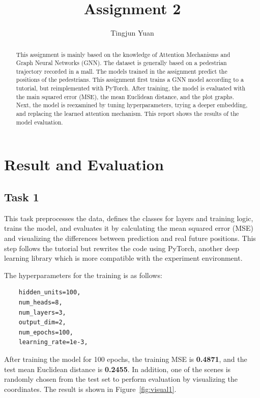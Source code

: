 \documentclass[conference]{IEEEtran}
\begin{document}
\title{Assignment 2}

\author{Tingjun Yuan}

\maketitle

\begin{abstract}
This assignment is mainly based on the knowledge of Attention Mechanisms and
Graph Neural Networks (GNN). The dataset is generally based on a pedestrian
trajectory recorded in a mall. The models trained in the assignment predict
the positions of the pedestrians. This assignment first trains a GNN model
according to a tutorial, but reimplemented with PyTorch. After training, the
model is evaluated with the main squared error (MSE), the mean Euclidean
distance, and the plot graphs. Next, the model is reexamined by tuning
hyperparameters, trying a deeper embedding, and replacing the learned attention
mechanism. This report shows the results of the model evaluation.
\end{abstract}

\section{Result and Evaluation}

\subsection*{Task 1}

This task preprocesses the data, defines the classes for layers and training
logic, trains the model, and evaluates it by calculating the mean squared error
(MSE) and visualizing the differences between prediction and real future
positions. This step follows the tutorial \cite{cite:tut} but rewrites the code
using PyTorch, another deep learning library which is more compatible with the
experiment environment.

The hyperparameters for the training is as follows:

\begin{verbatim}
    hidden_units=100,
    num_heads=8,
    num_layers=3,
    output_dim=2,
    num_epochs=100,
    learning_rate=1e-3,
\end{verbatim}

After training the model for 100 epochs, the training MSE is \textbf{0.4871},
and the test mean Euclidean distance is \textbf{0.2455}. In addition, one of
the scenes is randomly chosen from the test set to perform evaluation by
visualizing the coordinates. The result is shown in Figure~\ref{fig:visual1}.
\end{document}
